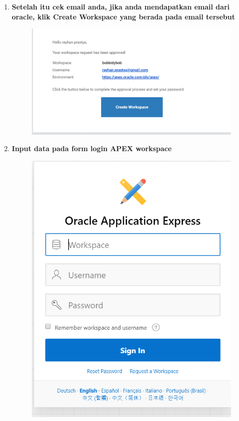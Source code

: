 \begin{enumerate}
\item \textbf{Setelah itu cek email anda, jika anda mendapatkan email dari oracle, klik Create Workspace yang berada pada email tersebut}
\begin{figure}[H]
    \centering
    \includegraphics[scale=0.3]{figures/7.png}
    \label{7}
\end{figure}


\item \textbf{Input data pada form login APEX workspace}\begin{figure}[H]
    \centering
    \includegraphics[scale=0.3]{figures/8.png}
    \label{8}
\end{figure}



\end{enumerate}
